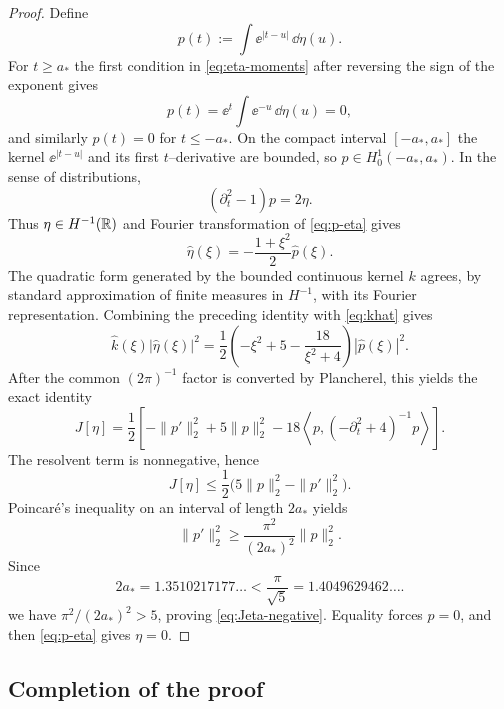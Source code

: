 \begin{proof}
Define
\[
 p(t):=\int\ee^{|t-u|}\,\dd\eta(u).
\]
For $t\ge a_*$ the first condition in \eqref{eq:eta-moments} after reversing the sign of the exponent gives
\[
 p(t)=\ee^t\int\ee^{-u}\,\dd\eta(u)=0,
\]
and similarly $p(t)=0$ for $t\le-a_*$.  On the compact interval $[-a_*,a_*]$ the kernel $\ee^{|t-u|}$ and its first $t$--derivative are bounded, so $p\in H_0^1(-a_*,a_*)$.  In the sense of distributions,
\begin{equation}\label{eq:p-eta}
 (\partial_t^2-1)p=2\eta.
\end{equation}
Thus $\eta\in H^{-1}(\mathbb{R})$ and Fourier transformation of \eqref{eq:p-eta} gives
\[
 \widehat\eta(\xi)=-\frac{1+\xi^2}{2}\widehat p(\xi).
\]
The quadratic form generated by the bounded continuous kernel $k$ agrees, by standard approximation of finite measures in $H^{-1}$, with its Fourier representation.  Combining the preceding identity with \eqref{eq:khat} gives
\[
 \widehat{k}(\xi)|\widehat\eta(\xi)|^2
 =\frac12\left(
 -\xi^2+5-\frac{18}{\xi^2+4}
 \right)|\widehat p(\xi)|^2.
\]
After the common $(2\pi)^{-1}$ factor is converted by Plancherel, this yields the exact identity
\begin{equation}\label{eq:Jeta-identity}
 J[\eta]
 =\frac12\left[
 -\|p'\|_2^2+5\|p\|_2^2
 -18\left\langle p,(-\partial_t^2+4)^{-1}p\right\rangle
 \right].
\end{equation}
The resolvent term is nonnegative, hence
\[
 J[\eta]
 \le\frac12\bigl(5\|p\|_2^2-\|p'\|_2^2\bigr).
\]
Poincar\'e's inequality on an interval of length $2a_*$ yields
\[
 \|p'\|_2^2
 \ge\frac{\pi^2}{(2a_*)^2}\|p\|_2^2.
\]
Since
\[
 2a_*=1.3510217177\ldots
 <\frac{\pi}{\sqrt5}=1.4049629462\ldots.
\]
we have $\pi^2/(2a_*)^2>5$, proving \eqref{eq:Jeta-negative}.  Equality forces $p=0$, and then \eqref{eq:p-eta} gives $\eta=0$.
\end{proof}

\subsection{Completion of the proof}

